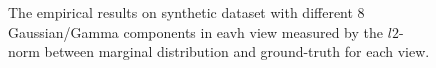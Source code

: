 \documentclass[11pt]{article}
\begin{document}
\begin{figure}
\caption{The empirical results on synthetic dataset with different 8 Gaussian/Gamma components in eavh view measured by the $l2$-norm between marginal distribution and ground-truth for each view.}
\end{figure}
\end{document}
